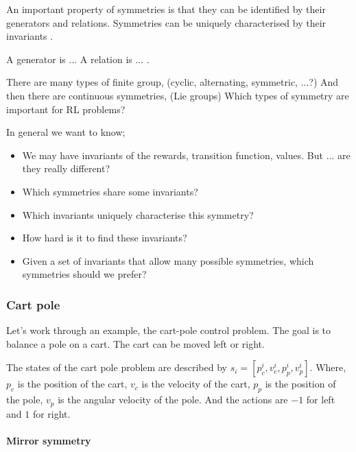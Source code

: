 An important property of symmetries is that they can be identified by their generators and relations.
Symmetries can be uniquely characterised by their invariants \cite{PeterOlver1999}.

{\color{red}A generator is ... A relation is ... .}

There are many types of finite group, (cyclic, alternating, symmetric, ...?)
And then there are continuous symmetries, (Lie groups)
Which types of symmetry are important for RL problems?


In general we want to know;

\begin{itemize}
	\tightlist
	\item We may have invariants of the rewards, transition function, values. But ... are they really different?
	\item Which symmetries share some invariants?
	\item Which invariants uniquely characterise this symmetry?
  \item How hard is it to find these invariants?
  \item Given a set of invariants that allow many possible symmetries, which symmetries should we prefer?
\end{itemize}

\subsubsection{Cart pole}

Let's work through an example, the cart-pole control problem. The goal is to balance a pole on a cart.
The cart can be moved left or right.

The states of the cart pole problem are described by $s_i = [p_c^i, v_c^i, p_p^i, v_p^i]$\footnotemark. Where, $p_c$ is the position of the cart, $v_c$ is the velocity of the cart, $p_p$ is the position of the pole, $v_p$ is the angular velocity of the pole. And the actions are $-1$ for left and $1$ for right.


\paragraph{Mirror symmetry}

